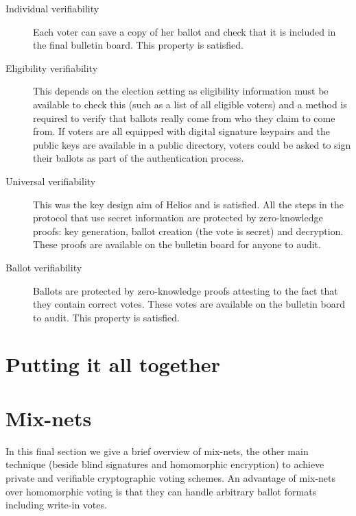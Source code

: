 \documentclass[envcountsame]{llncs}
\begin{document}
\begin{description}
\item[Individual verifiability]
Each voter can save a copy of her ballot and check that it is included in the
final bulletin board. This property is satisfied.

\item[Eligibility verifiability]
This depends on the election setting as eligibility information must be
available to check this (such as a list of all eligible voters) and a method is
required to verify that ballots really come from who they claim to come from. If
voters are all equipped with digital signature keypairs and the public keys are
available in a public directory, voters could be asked to sign their ballots as
part of the authentication process.

\item[Universal verifiability]
This was the key design aim of Helios and is satisfied. All the steps in the
protocol that use secret information are protected by zero-knowledge proofs:
key generation, ballot creation (the vote is secret) and decryption. These
proofs are available on the bulletin board for anyone to audit.

\item[Ballot verifiability]
Ballots are protected by zero-knowledge proofs attesting to the fact that they
contain correct votes. These votes are available on the bulletin board to audit.
This property is satisfied\footnotemark.
\end{description}


\section{Putting it all together}

\section{Mix-nets}
\label{sec:mixnet}

In this final section we give a brief overview of mix-nets, the other main
technique (beside blind signatures and homomorphic encryption) to achieve
private and verifiable cryptographic voting schemes. An advantage of mix-nets
over homomorphic voting is that they can handle arbitrary ballot formats
including write-in votes.
\end{document}
